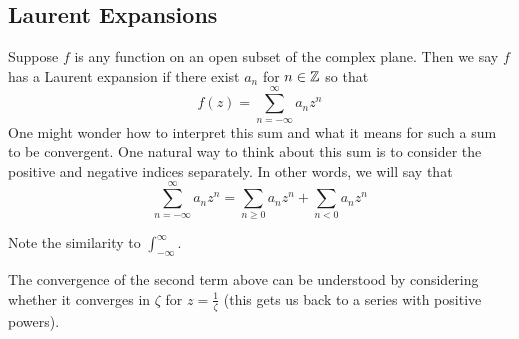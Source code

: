 \subsection{Laurent Expansions}
Suppose $f$ is any function on an open subset of the complex plane. Then we say $f$ has a Laurent expansion if there exist $a_n$ for $n \in \mathbb{Z}$ so that
$$ f(z) = \sum_{n = - \infty}^\infty a_n z^n $$
One might wonder how to interpret this sum and what it means for such a sum to be convergent. One natural way to think about this sum is to consider the positive and negative indices separately. In other words, we will say that 
$$ \sum_{n = - \infty}^\infty a_n z^n = \sum_{n \geq 0} a_n z^n + \sum_{n < 0} a_n z^n $$
\begin{remark}
Note the similarity to $\displaystyle \int_{-\infty}^{\infty}$.
\end{remark}
The convergence of the second term above can be understood by considering whether it converges in $\zeta$ for $z = \frac{1}{\zeta}$ (this gets us back to a series with positive powers).

